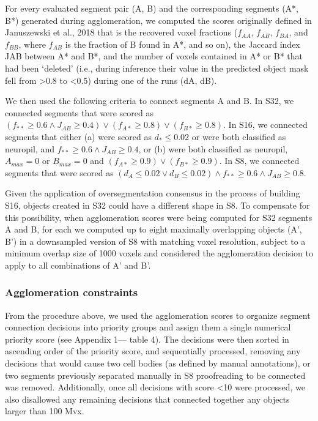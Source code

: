 \documentclass{article}
\begin{document}
For every evaluated segment pair (A, B) and the corresponding segments (A*, B*) generated during agglomeration, we computed the scores originally defined in Januszewski et al., 2018 that is the recovered voxel fractions ($f_{AA}$, $f_{AB}$, $f_{BA}$, and $f_{BB}$, where $f_{AB}$ is the fraction of B found in A*, and so on), the Jaccard index JAB between A* and B*, and the number of voxels contained in A* or B* that had been ‘deleted’ (i.e., during inference their value in the predicted object mask fell from >0.8 to <0.5) during one of the runs (dA, dB).

We then used the following criteria to connect segments A and B. In S32, we connected segments that were scored as $(f_{**} \geq 0.6 \wedge J_{AB} \geq 0.4) \vee (f_{A*} \geq 0.8) \vee (f_{B*} \geq 0.8)$. In S16, we connected segments that either (a) were scored as $d_{*} \leq 0.02$ or were both classified as neuropil, and $f_{**} \geq 0.6 \wedge J_{AB} \geq 0.4$, or (b) were both classified as neuropil, $A_{max} = 0$ or $B_{max} = 0$ and $(f_{A*} \geq 0.9) \vee (f_{B*} \geq 0.9)$. In S8, we connected segments that were scored as $(d_A \leq 0.02 \vee d_B \leq 0.02) \wedge f_{**} \geq 0.6 \wedge J_{AB} \geq 0.8$.

Given the application of oversegmentation consensus in the process of building S16, objects created in S32 could have a different shape in S8. To compensate for this possibility, when agglomeration scores were being computed for S32 segments A and B, for each we computed up to eight maximally overlapping objects (A’, B’) in a downsampled version of S8 with matching voxel resolution, subject to a minimum overlap size of 1000 voxels and considered the agglomeration decision to apply to all combinations of A’ and B’.

\subsubsection*{Agglomeration constraints}

From the procedure above, we used the agglomeration scores to organize segment connection decisions into priority groups and assign them a single numerical priority score (see Appendix 1— table 4). The decisions were then sorted in ascending order of the priority score, and sequentially processed, removing any decisions that would cause two cell bodies (as defined by manual annotations), or two segments previously separated manually in S8 proofreading to be connected was removed. Additionally, once all decisions with score <10 were processed, we also disallowed any remaining decisions that connected together any objects larger than 100 Mvx.
\end{document}
